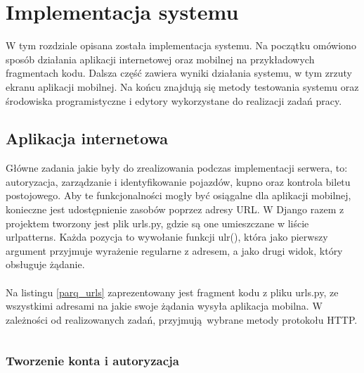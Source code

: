 \setcounter{listing}{0}

\section{Implementacja systemu}

W tym rozdziale opisana została implementacja systemu. Na początku omówiono sposób działania aplikacji internetowej oraz mobilnej na przykładowych fragmentach kodu. Dalsza część zawiera wyniki działania systemu, w tym zrzuty ekranu aplikacji mobilnej. Na końcu znajdują się metody testowania systemu oraz środowiska programistyczne i edytory wykorzystane do realizacji zadań pracy.

\subsection{Aplikacja internetowa}

Główne zadania jakie były do zrealizowania podczas implementacji serwera, to: autoryzacja, zarządzanie i identyfikowanie pojazdów, kupno oraz kontrola biletu postojowego. Aby te funkcjonalności mogły być osiągalne dla aplikacji mobilnej, konieczne jest udostępnienie zasobów poprzez adresy URL. W Django razem z projektem tworzony jest plik urls.py, gdzie są one umieszczane w liście urlpatterns. Każda pozycja to wywołanie funkcji ulr(), która jako pierwszy argument przyjmuje wyrażenie regularne z adresem, a jako drugi widok, który obsługuje żądanie.
\\
\\
Na listingu \ref{parq_urls} zaprezentowany jest fragment kodu z pliku urls.py, ze wszystkimi adresami na jakie swoje żądania wysyła aplikacja mobilna. W zależności od realizowanych zadań, przyjmują wybrane metody protokołu HTTP.

\begin{singlespace}
	\label{parq_urls}
	\vspace{0.3cm}
	\inputminted[fontsize=\footnotesize, linenos=true]{python}{src/imp/urlpatterns.py}
\end{singlespace}

\subsubsection*{Tworzenie konta i autoryzacja}


